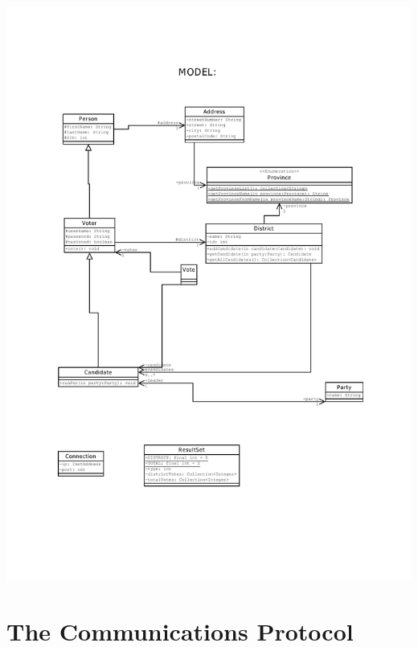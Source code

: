\documentclass[11pt,english]{article}
\begin{document}
\includegraphics[width=6in]{figures/uml1.pdf} \\


\section{The Communications Protocol}
\end{document}
